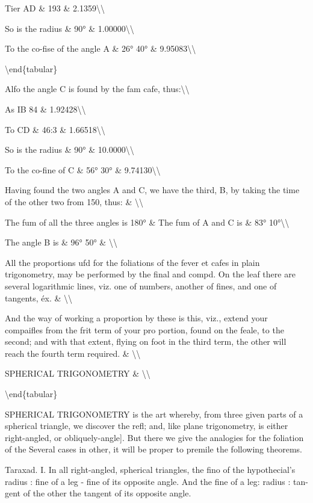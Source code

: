 \documentclass{article}
\begin{document}
Tier AD \& 193 \& 2.1359\textbackslash{}\textbackslash{}

So is the radius \& 90° \& 1.00000\textbackslash{}\textbackslash{}

To the co-fise of the angle A \& 26° 40° \& 9.95083\textbackslash{}\textbackslash{}

\textbackslash{}end\{tabular\}

Alfo the angle C is found by the fam cafe, thus:\textbackslash{}\textbackslash{}

As IB 84 \& 1.92428\textbackslash{}\textbackslash{}

To CD \& 46:3 \& 1.66518\textbackslash{}\textbackslash{}

So is the radius \& 90° \& 10.0000\textbackslash{}\textbackslash{}

To the co-fine of C \& 56° 30° \& 9.74130\textbackslash{}\textbackslash{}

Having found the two angles A and C, we have the third, B, by taking the time of the other two from 150, thus: \& \textbackslash{}\textbackslash{}

The fum of all the three angles is 180° \& The fum of A and C is \& 83° 10°\textbackslash{}\textbackslash{}

The angle B is \& 96° 50° \& \textbackslash{}\textbackslash{}

All the proportions ufd for the foliations of the fever et cafes in plain trigonometry, may be performed by the final and compd. On the leaf there are several logarithmic lines, viz. one of numbers, another of fines, and one of tangents, éx. \& \textbackslash{}\textbackslash{}

And the way of working a proportion by these is this, viz., extend your compaifles from the frit term of your pro portion, found on the feale, to the second; and with that extent, flying on foot in the third term, the other will reach the fourth term required. \& \textbackslash{}\textbackslash{}

SPHERICAL TRIGONOMETRY \& \textbackslash{}\textbackslash{}

\textbackslash{}end\{tabular\}

SPHERICAL TRIGONOMETRY is the art whereby, from three given parts of a spherical triangle, we discover the refl; and, like plane trigonometry, is either right-angled, or obliquely-angle]. But there we give the analogies for the foliation of the Several cases in other, it will be proper to premile the following theorems.

Taraxad. I. In all right-angled, spherical triangles, the fino of the hypothecial’s radius : fine of a leg - fine of its opposite angle. And the fine of a leg: radius : tan- gent of the other the tangent of its opposite angle.
\end{document}
